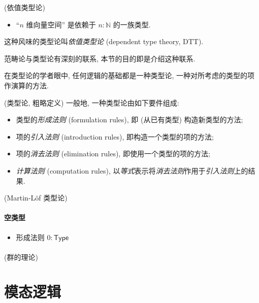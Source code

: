 \begin{example}
	{(依值类型论)}
	\begin{itemize}
		\item ``$n$ 维向量空间'' 是依赖于 $n\colon \mathbb{N}$ 的一族类型. 
	\end{itemize}
	这种风味的类型论叫\emph{依值类型论} (dependent type theory, DTT).
\end{example}

范畴论与类型论有深刻的联系, 本节的目的即是介绍这种联系.

在类型论的学者眼中, 任何逻辑的基础都是一种类型论, 一种对所考虑的类型的项作演算的方法.

\begin{definition}
	{(类型论, 粗略定义)}
	一般地, 一种类型论由如下要件组成:
	\begin{itemize}
		\item 类型的\emph{形成法则} (formulation rules), 即 (从已有类型) 构造新类型的方法;
		\item 项的\emph{引入法则} (introduction rules), 即构造一个类型的项的方法;
		\item 项的\emph{消去法则} (elimination rules), 即使用一个类型的项的方法;
		\item \emph{计算法则} (computation rules), 以\emph{等式}表示将\emph{消去法则}作用于\emph{引入法则}上的结果.
	\end{itemize}
\end{definition}

\begin{example}
	{(Martin-L\"of 类型论)}
	\paragraph{空类型}
	\begin{itemize}
		\item 形成法则 $0\colon \mathsf {Type}$
	\end{itemize}
	
	\paragraph{}
\end{example}

\begin{example}
	{(群的理论)}
	
\end{example}

\section{模态逻辑}

